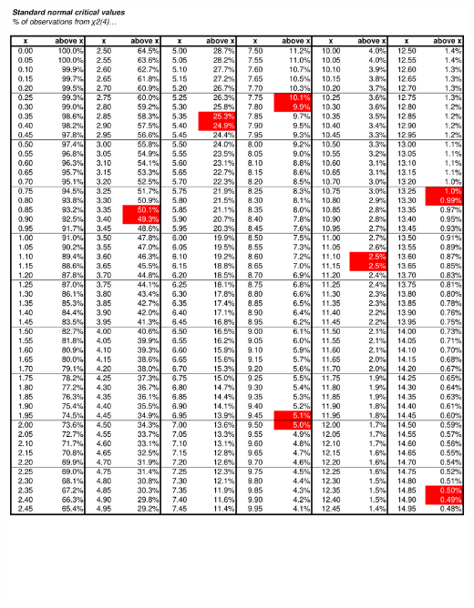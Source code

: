\documentclass[8pt,letterpaper, landscape]{extarticle} %
\begin{document}
\begin{center}
\includegraphics[height=9.75in, angle=90]{images/cv6}

\end{center}
\end{document}
